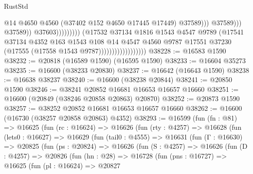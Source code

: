 \begin{lexlean}{RustStd}
\begin{coremodule}
{\begin{coremodule}
{{{{{{{{{{{{{{{{{{{{{{{{{{{{{{{{{{{{{{{{{{{{{{{{{{{{{{{                                                                  @14
                                                                  @4650
                                                                  @4560
                                                                  (@37402 @152 @4650 @17445 @17449)
                                                                  @37589)))
                                                            @37589)))
                                                      @37589))
                                                  @37603)))))))))
                                (@17532
                                  @37134
                                  @1816
                                  @1543
                                  @4547
                                  @9789
                                  (@17541
                                    @37134
                                    @4352
                                    @163
                                    @1543
                                    @108
                                    @14
                                    @4547
                                    @4560
                                    @9787
                                    @17551
                                    @37230
                                    (@17555 (@17558 @1543 @9787))))))))))))))))))
@38228 := @16583 @1590
@38232 := @20818 (@16589 @1590) (@16595 @1590)
@38233 := @16604 @35273
@38235 := @16600 (@38233 @20830)
@38237 := @16642 (@16643 @1590)
@38238 := @16638 @38237
@38240 := @16600 (@38238 @20844)
@38241 := @20850 @1590
@38246 := @38241 @20852 @16681 @16653 @16657 @16660
@38251 := @16600 (@20849 (@38246 @20858 @20863) @20870)
@38252 := @20873 @1590
@38257 := @38252 @20852 @16681 @16653 @16657 @16660
@38262 := @16600 (@16730 (@38257 @20858 @20863) @4352)
@38293 := @16599
    (fun (fn : @81) =>
    @16625
      (fun (rc : @16624) =>
      @16626
        (fun (rty : @4257) =>
        @16628
          (fun (lets0 : @16627) =>
          @16629
            (fun (tail0 : @4555) =>
            @16631
              (fun (Γ : @16630) =>
              @20825
                (fun (ps : @20824) =>
                @16626
                  (fun (S : @4257) =>
                  @16626
                    (fun (D : @4257) =>
                    @20826
                      (fun (hn : @28) =>
                      @16728
                        (fun (pns : @16727) =>
                        @16625
                          (fun (pl : @16624) =>
                          @20827
}}}}}}}}}}}}}}}}}}}}}}}}}}}}}}}}}}}}}}}}}}}}}}}}}}}}}}}
\end{coremodule}}
\end{coremodule}
\end{lexlean}
